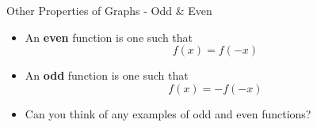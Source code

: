\documentclass[10pt]{beamer}
\begin{document}
\begin{frame}{Other Properties of Graphs - Odd \& Even}
  \begin{itemize}[<+->]
    \item An \textbf{even} function is one such that
      \begin{equation}
        f(x) = f(-x)
      \end{equation}
    \item An \textbf{odd} function is one such that
      \begin{equation}
        f(x) = -f(-x)
      \end{equation}
    \item Can you think of any examples of odd and even functions?
  \end{itemize}
\end{frame}
\end{document}
